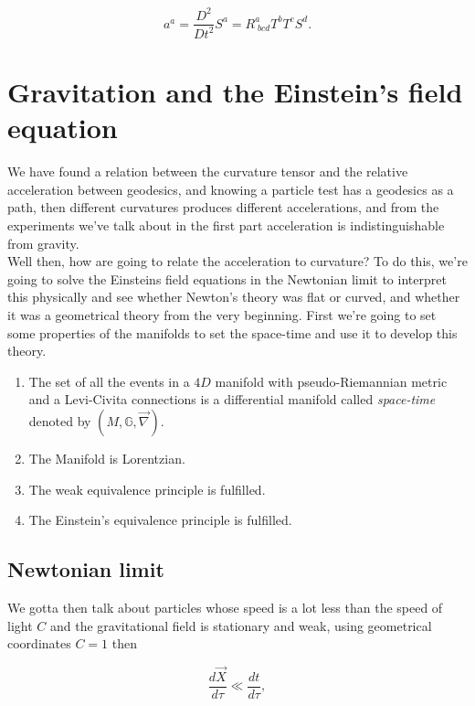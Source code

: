\begin{equation}
    a^a = \frac{D^2}{Dt^2}S^a = R^a_{\;bcd}T^bT^cS^d.
\end{equation}
    
\section{Gravitation and the Einstein's field equation}

    We have found a relation between the curvature tensor and the relative acceleration between geodesics, and knowing a particle test has a geodesics as a path, then different curvatures produces different accelerations, and from the experiments we've talk about in the first part acceleration is indistinguishable from gravity.\\
    Well then, how are going to relate the acceleration to curvature? To do this, we're going to solve the Einsteins field equations in the Newtonian limit to interpret this physically and see whether Newton's theory was flat or curved, and whether it was a geometrical theory from the very beginning. First we're going to set some properties of the manifolds to set the space-time and use it to develop this theory.

    \begin{enumerate}
        \item The set of all the events in a $4D$ manifold with pseudo-Riemannian metric and a Levi-Civita connections is a differential manifold called \textit{space-time} denoted by $(M,\mathbb{G},\Vec{\nabla})$.
        \item The Manifold is Lorentzian.
        \item The weak equivalence principle is fulfilled.
        \item The Einstein's equivalence principle  is fulfilled.
    \end{enumerate}
    \subsection{Newtonian limit}

    We gotta then talk about particles whose speed is a lot less than the speed of light $C$  and the gravitational field is stationary and weak, using geometrical coordinates $C=1$ then

    \begin{equation}
        \frac{d\Vec{X}}{d\tau} \ll \frac{dt}{d\tau},
    \end{equation}

